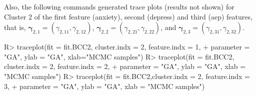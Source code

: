 

Also, the following commands generated trace plots (results not shown) for Cluster 2 of the first feature (anxiety), second (depress) and third (aep) features, that is,  $\boldsymbol{\gamma}_{2,1} = (\gamma_{2,11}, \gamma_{2,12})$,  $\boldsymbol{\gamma}_{2,2} = (\gamma_{2,21}, \gamma_{2,22})$, and $\boldsymbol{\gamma}_{2,3} = (\gamma_{2,31}, \gamma_{2,32})$. 

\begin{example}
R> traceplot(fit = fit.BCC2, cluster.indx = 2, feature.indx = 1,
+        parameter = "GA", ylab = "GA", xlab="MCMC samples")
R> traceplot(fit = fit.BCC2, cluster.indx = 2, feature.indx = 2,
+        parameter = "GA", ylab = "GA", xlab = "MCMC samples")
R> traceplot(fit = fit.BCC2,cluster.indx = 2, feature.indx = 3,
+        parameter = "GA", ylab = "GA", xlab = "MCMC samples")
\end{example} 





